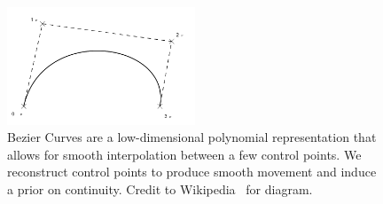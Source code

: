 \begin{figure}
    \centering
    \includegraphics[width=0.5\textwidth]{bezier_curve.png}
    \caption{
        Bezier Curves are a low-dimensional polynomial representation that allows for smooth interpolation between a few control points. We reconstruct control points to produce smooth movement and induce a prior on continuity. Credit to Wikipedia~\cite{bezier_diagram} for diagram.
    }
    \label{fig:bezier_diagram}
\end{figure}

